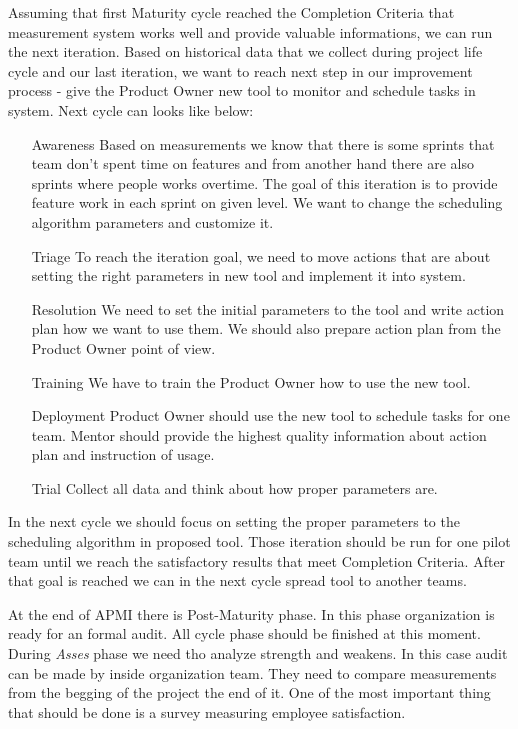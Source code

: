 Assuming that first Maturity cycle reached the Completion Criteria that measurement system works well and provide valuable informations, we can run the next iteration. Based on historical data that we collect during project life cycle and our last iteration, we want to reach next step in our improvement process - give the Product Owner new tool to monitor and schedule tasks in system. Next cycle can looks like below:

\begin{enumerate}
\item[Awareness] Based on measurements we know that there is some sprints that team don't spent time on features and from another hand there are also sprints where people works overtime. The goal of this iteration is to provide feature work in each sprint on given level. We want to change the scheduling algorithm parameters and customize it.
\item[Triage] To reach the iteration goal, we need to move actions that are about setting the right parameters in new tool and implement it into system.
\item[Resolution] We need to set the initial parameters to the tool and write action plan how we want to use them. We should also prepare action plan from the Product Owner point of view.
\item[Training] We have to train the Product Owner how to use the new tool. 
\item[Deployment] Product Owner should use the new tool to schedule tasks for one team. Mentor should provide the highest quality information about action plan and instruction of usage. 
\item[Trial] Collect all data and think about how proper parameters are.
\end{enumerate}
In the next cycle we should focus on setting the proper parameters to the scheduling algorithm in proposed tool. Those iteration should be run for one pilot team until we reach the satisfactory results that meet Completion Criteria. After that goal is reached we can in the next cycle spread tool to another teams. 

At the end of APMI there is Post-Maturity phase. In this phase organization is ready for an formal audit. All cycle phase should be finished at this moment. During \textit{Asses} phase we need tho analyze strength and weakens. In this case audit can be made by inside organization team. They need to compare measurements from the begging of the project the end of it. One of the most important thing that should be done is a survey measuring employee satisfaction.

